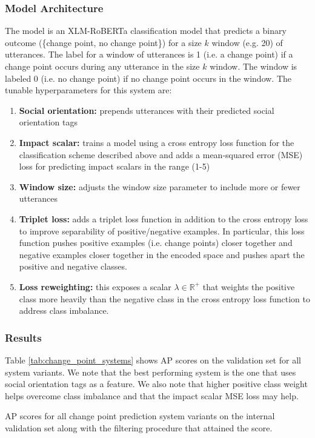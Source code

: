 \documentclass[12pt]{article}
\begin{document}
\subsubsection{Model Architecture}
The model is an XLM-RoBERTa classification model that predicts a binary outcome (\{change point, no change point\}) for a size $k$ window (e.g. 20) of utterances. The label for a window of utterances is 1 (i.e. a change point) if a change point occurs during any utterance in the size $k$ window. The window is labeled 0 (i.e. no change point) if no change point occurs in the window. The tunable hyperparameters for this system are:
\begin{enumerate}
    \item \textbf{Social orientation:} prepends utterances with their predicted social orientation tags
    \item \textbf{Impact scalar:} trains a model using a cross entropy loss function for the classification scheme described above and adds a mean-squared error (MSE) loss for predicting impact scalars in the range (1-5)
    \item \textbf{Window size:} adjusts the window size parameter to include more or fewer utterances
    \item \textbf{Triplet loss:} adds a triplet loss function in addition to the cross entropy loss to improve separability of positive/negative examples. In particular, this loss function pushes positive examples (i.e. change points) closer together and negative examples closer together in the encoded space and pushes apart the positive and negative classes.
    \item \textbf{Loss reweighting:} this exposes a scalar $\lambda \in \mathbb{R^{+}}$ that weights the positive class more heavily than the negative class in the cross entropy loss function to address class imbalance.
\end{enumerate}

\subsubsection{Results}

Table \ref{tab:change_point_systems} shows AP scores on the validation set for all system variants. We note that the best performing system is the one that uses social orientation tags as a feature. We also note that higher positive class weight helps overcome class imbalance and that the impact scalar MSE loss may help.

\begin{table}[H]
    \centering
    
    \caption{AP scores for all change point prediction system variants on the internal validation set along with the filtering procedure that attained the score.}
    \label{tab:change_point_systems}
\end{table}
\end{document}
